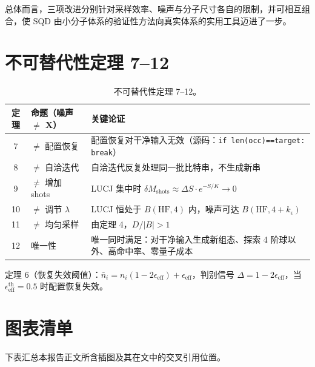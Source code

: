 \documentclass[UTF8,12pt,a4paper]{ctexart}
\begin{document}
总体而言，三项改进分别针对采样效率、噪声与分子尺寸各自的限制，并可相互组合，使 SQD 由小分子体系的验证性方法向真实体系的实用工具迈进了一步。

\appendix
\section{不可替代性定理 7--12}

\begin{table}[H]
\centering
\caption{不可替代性定理 7--12。}
\begin{tabular}{cp{4.5cm}p{6.5cm}}
\toprule
定理 & 命题（噪声 $\ne$ X） & 关键论证 \\
\midrule
7 & $\ne$ 配置恢复 & 配置恢复对干净输入无效（源码：\texttt{if len(occ)==target: break}） \\
8 & $\ne$ 自洽迭代 & 自洽迭代反复处理同一批比特串，不生成新串 \\
9 & $\ne$ 增加 shots & LUCJ 集中时 $\delta M_{\text{shots}}\approx\Delta S\cdot e^{-S/K}\to0$ \\
10 & $\ne$ 调节 $\lambda$ & LUCJ 恒处于 $B(\text{HF},4)$ 内，噪声可达 $B(\text{HF},4{+}k_\epsilon)$ \\
11 & $\ne$ 均匀采样 & 由定理 4，$D/\lvert B\rvert>1$ \\
12 & 唯一性 & 唯一同时满足：对干净输入生成新组态、探索 4 阶球以外、高命中率、零量子成本 \\
\bottomrule
\end{tabular}
\end{table}

定理 6（恢复失效阈值）：$\bar n_i=n_i(1-2\epsilon_{\text{eff}})+\epsilon_{\text{eff}}$，判别信号 $\Delta=1-2\epsilon_{\text{eff}}$，当 $\epsilon_{\text{eff}}^{\text{th}}=0.5$ 时配置恢复失效。

\section{图表清单}

下表汇总本报告正文所含插图及其在文中的交叉引用位置。
\end{document}
